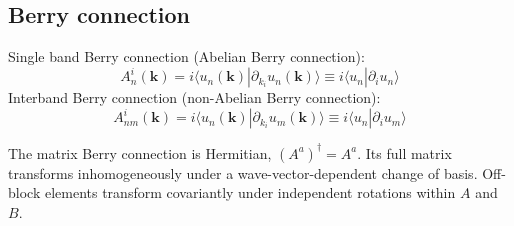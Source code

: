 \documentclass[prx,amsmath,amssymb,superscriptaddress,longbibliography]{revtex4-2}
\begin{document}
{\color{black}
\subsection{Berry connection}

Single band Berry connection (Abelian Berry connection):
\begin{equation}
    A_n^i(\bm{k}) = i \langle u_n(\bm{k})| \partial_{k_i} u_n(\bm{k}) \rangle \equiv i \langle{u_n}| \partial_{i}{u_n}\rangle 
\label{eq:berry-connection}\end{equation}
Interband Berry connection (non-Abelian Berry connection):
\begin{equation}
    A_{nm}^i(\bm{k}) = i \langle u_n(\bm{k})| \partial_{k_i} u_m(\bm{k}) \rangle \equiv i \langle{u_n}| \partial_{i}{u_m}\rangle 
\end{equation}

}
The matrix Berry connection is Hermitian, $(A^a)^\dagger=A^a$.
Its full matrix transforms inhomogeneously under a wave-vector-dependent
change of basis. Off-block elements transform covariantly under independent
rotations within $A$ and $B$.
\end{document}
